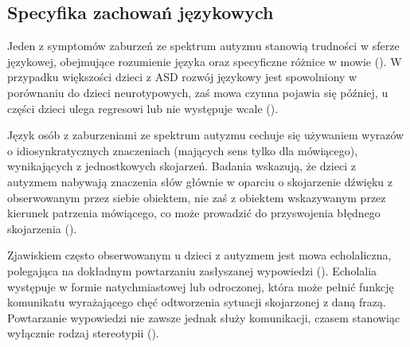     
    
    \subsection{Specyfika zachowań językowych}
    Jeden z symptomów zaburzeń ze spektrum autyzmu stanowią trudności w sferze językowej, obejmujące rozumienie języka oraz specyficzne różnice w mowie (\cite{frith2008autyzm}).
    W przypadku większości dzieci z ASD rozwój językowy jest spowolniony w porównaniu do dzieci neurotypowych, zaś mowa czynna pojawia się później, u części dzieci ulega regresowi lub nie występuje wcale (\cite{tager2005language}).
    
    Język osób z zaburzeniami ze spektrum autyzmu cechuje się używaniem wyrazów o idiosynkratycznych znaczeniach (mających sens tylko dla mówiącego), wynikających z jednostkowych skojarzeń.
    Badania wskazują, że dzieci z autyzmem nabywają znaczenia słów głównie w oparciu o skojarzenie dźwięku z obserwowanym przez siebie obiektem, nie zaś z obiektem wskazywanym przez kierunek patrzenia mówiącego, co może prowadzić do przyswojenia błędnego skojarzenia (\cite{baron1997children}).
    
    Zjawiskiem często obserwowanym u dzieci z autyzmem jest mowa echolaliczna, polegająca na dokładnym powtarzaniu zasłyszanej wypowiedzi (\cite{tager2005language}).
    Echolalia występuje w formie natychmiastowej lub odroczonej, która może pełnić funkcję komunikatu wyrażającego chęć odtworzenia sytuacji skojarzonej z daną frazą.
    Powtarzanie wypowiedzi nie zawsze jednak służy komunikacji, czasem stanowiąc wyłącznie rodzaj stereotypii (\cite{frith2008autyzm}).
    
